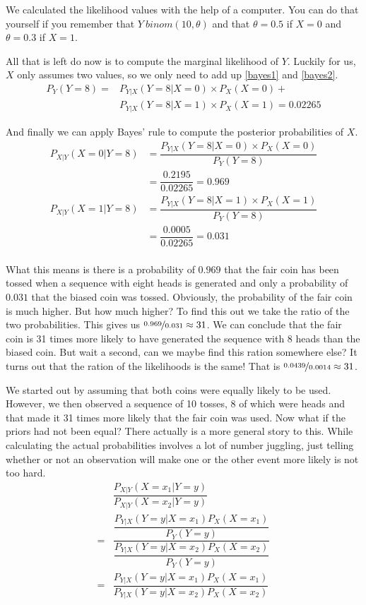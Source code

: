 \documentclass[a4paper,11pt,leqno]{report}
\begin{document}
We calculated the likelihood values with the help of a computer. You can do that yourself if you remember that
$ Y ~ binom(10,\theta) $ and that $ \theta=0.5 $ if $ X=0 $ and $ \theta=0.3 $ if $ X=1 $. 

All that is left do now is to compute the marginal likelihood of $ Y $. Luckily for us, $ X $ only assumes two
values, so we only need to add up \ref{bayes1} and \ref{bayes2}.
\begin{align}
P_{Y}(Y=8) = &P_{Y|X}(Y=8|X=0) \times P_{X}(X=0) + \\
&P_{Y|X}(Y=8|X=1) \times P_{X}(X=1) = 0.02265 \nonumber
\end{align}

And finally we can apply Bayes' rule to compute the posterior probabilities of $ X $.
\begin{align}
P_{X|Y}(X=0|Y=8) &= \dfrac{P_{Y|X}(Y=8|X=0) \times P_{X}(X=0)}{P_{Y}(Y=8)} \\
&= \dfrac{0.2195}{0.02265} = 0.969 \nonumber \\
P_{X|Y}(X=1|Y=8) &= \dfrac{P_{Y|X}(Y=8|X=1) \times P_{X}(X=1)}{P_{Y}(Y=8)} \\
&= \dfrac{0.0005}{0.02265} = 0.031 \nonumber \\
\end{align}

What this means is there is a probability of $ 0.969 $ that the fair coin has been tossed when a sequence with eight heads is
generated and only a probability of $ 0.031 $ that the biased coin was tossed. Obviously, the probability of the fair 
coin is much higher. But how much higher? To find this out we take the ratio of the two probabilities. This gives us 
$ \nicefrac{0.969}{0.031} \approx 31 $. We can conclude that the fair coin is 31 times more likely to have generated the sequence with
8 heads than the biased coin. But wait a second, can we maybe find this ration somewhere else? It turns out that 
the ration of the likelihoods is the same! That is $ \nicefrac{0.0439}{0.0014} \approx 31 $.

We started out by assuming that both coins were equally likely to be used. However, we then observed a sequence of 10 tosses, 8 of 
which were heads and that made it 31 times more likely that the fair coin was used. Now what if the priors had not been equal?
There actually is a more general story to this. While calculating the actual probabilities involves a lot of number juggling, just
telling whether or not an observation will make one or the other event more likely is not too hard.
\begin{align}
&\dfrac{P_{X|Y}(X=x_{1}|Y=y)}{P_{X|Y}(X=x_{2}|Y=y)} \\[1em]
=& \dfrac{\dfrac{P_{Y|X}(Y=y|X=x_{1})P_{X}(X=x_{1})}{P_{Y}(Y=y)}}{\dfrac{P_{Y|X}(Y=y|X=x_{2})P_{X}(X=x_{2})}{P_{Y}(Y=y)}} \\[1em]
=& \dfrac{P_{Y|X}(Y=y|X=x_{1})P_{X}(X=x_{1})}{P_{Y|X}(Y=y|X=x_{2})P_{X}(X=x_{2})}
\end{align}
\end{document}

